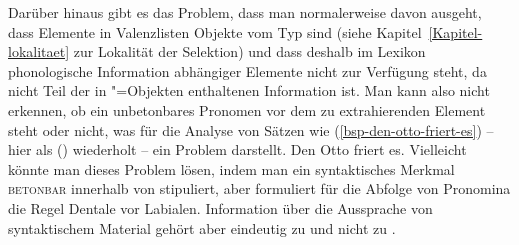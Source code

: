 Darüber hinaus gibt es das Problem, dass man normalerweise davon ausgeht, dass Elemente in Valenzlisten
Objekte vom Typ  sind (siehe Kapitel~\ref{Kapitel-lokalitaet} zur Lokalität der Selektion)
und dass deshalb im Lexikon phonologische Information abhängiger Elemente nicht zur Verfügung steht,
da \phon nicht Teil der in "=Objekten enthaltenen Information ist. Man kann also nicht
erkennen, ob ein unbetonbares Pronomen vor dem zu extrahierenden Element steht oder nicht, was für
die Analyse von Sätzen wie (\ref{bsp-den-otto-friert-es}) -- hier als () wiederholt -- ein
Problem darstellt. 
\ea
\label{bsp-den-otto-friert-es-zwei}
Den Otto friert es.
\z
Vielleicht könnte man dieses Problem lösen, indem man ein syntaktisches Merkmal \textsc{betonbar}
innerhalb von \synsem stipuliert, aber \citet[]{Abraham95a-u} formuliert für die Abfolge
von Pronomina die Regel Dentale vor Labialen. Information über die Aussprache von syntaktischem
Material gehört aber eindeutig zu \phon und nicht zu \synsem.
%
%
%
%



